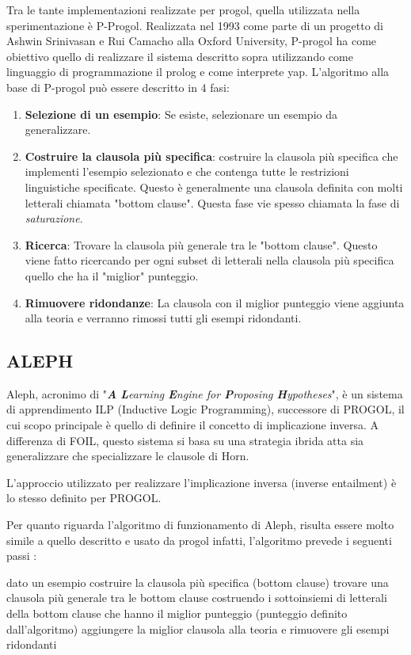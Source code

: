Tra le tante implementazioni realizzate per progol, quella utilizzata nella sperimentazione è P-Progol. Realizzata nel 1993 come parte di un progetto di Ashwin Srinivasan e Rui Camacho alla Oxford University, P-progol ha come obiettivo quello di realizzare il sistema descritto sopra utilizzando come linguaggio di programmazione il prolog e come interprete yap.
L'algoritmo alla base di P-progol può essere descritto in 4 fasi:
\begin{enumerate}
	\item \textbf{Selezione di un esempio}: Se esiste, selezionare un esempio da generalizzare.
	\item \textbf{Costruire la clausola più specifica}: costruire la clausola più specifica che implementi l'esempio selezionato e che contenga tutte le restrizioni linguistiche specificate. Questo è generalmente una clausola definita con molti letterali chiamata "bottom clause". Questa fase vie spesso chiamata la fase di \emph{saturazione}.
	\item \textbf{Ricerca}: Trovare la clausola più generale tra le "bottom clause". Questo viene fatto ricercando per ogni subset di letterali nella clausola più specifica quello che ha il "miglior" punteggio.
	\item \textbf{Rimuovere ridondanze}: La clausola con il miglior punteggio viene aggiunta alla teoria e verranno rimossi tutti gli esempi ridondanti.
\end{enumerate}

\subsection{ALEPH}
Aleph, acronimo di "\emph{\textbf{A} \textbf{L}earning \textbf{E}ngine for \textbf{P}roposing \textbf{H}ypotheses}", è un sistema di apprendimento ILP (Inductive Logic Programming), successore di PROGOL, il cui scopo principale è quello di definire il concetto di implicazione inversa.
A differenza di FOIL, questo sistema si basa su una strategia ibrida atta sia generalizzare che specializzare le clausole di Horn. 

L'approccio utilizzato per realizzare l'implicazione inversa (inverse entailment) è lo stesso definito per PROGOL.

Per quanto riguarda l'algoritmo di funzionamento di Aleph, risulta essere molto simile a quello descritto e usato da progol infatti, l'algoritmo prevede i seguenti passi :

\begin{algorithm}
	\begin{algorithmic}[1]
		\STATE dato un esempio costruire la clausola più specifica (bottom clause)
		\STATE trovare una clausola più generale tra le bottom clause costruendo i sottoinsiemi di letterali della bottom clause che hanno il miglior punteggio (punteggio definito dall'algoritmo)
		\STATE aggiungere la miglior clausola alla teoria e rimuovere gli esempi ridondanti 
		\ENDFOR
	\end{algorithmic}
\end{algorithm}

